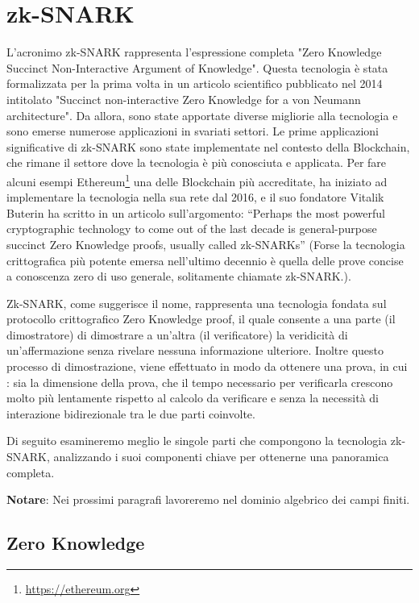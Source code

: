 \section{zk-SNARK}

L'acronimo zk-SNARK rappresenta l'espressione completa "Zero Knowledge Succinct Non-Interactive Argument of Knowledge".
Questa tecnologia è stata formalizzata per la prima volta in un articolo scientifico pubblicato nel 2014 intitolato
"Succinct non-interactive Zero Knowledge for a von Neumann architecture"\cite{10.5555/2671225.2671275}. Da allora, sono state apportate diverse migliorie alla tecnologia
e sono emerse numerose applicazioni in svariati settori. Le prime applicazioni significative di zk-SNARK sono state
implementate nel contesto della Blockchain, che rimane il settore dove la tecnologia è più conosciuta e applicata. Per
fare alcuni esempi Ethereum\footnote{\url{https://ethereum.org}} una delle Blockchain più accreditate,  ha iniziato ad implementare la tecnologia nella sua
rete dal 2016, e il suo fondatore Vitalik Buterin ha scritto in un articolo sull’argomento: “Perhaps the most powerful
cryptographic technology to come out of the last decade is general-purpose succinct Zero Knowledge proofs, usually
called zk-SNARKs” \cite{how-zk-snarks-are-possible} (Forse la tecnologia crittografica più potente emersa nell'ultimo decennio è quella delle prove
concise a conoscenza zero di uso generale, solitamente chiamate zk-SNARK.).

Zk-SNARK, come suggerisce il nome, rappresenta una tecnologia fondata sul protocollo crittografico Zero Knowledge proof,
il quale consente a una parte (il dimostratore) di dimostrare a un'altra (il verificatore) la veridicità di
un'affermazione senza rivelare nessuna informazione ulteriore. Inoltre questo processo di dimostrazione, viene
effettuato in modo da ottenere una prova, in cui : sia la dimensione della prova, che il tempo necessario per verificarla
crescono molto più lentamente rispetto al calcolo da verificare e senza la necessità di interazione bidirezionale tra le
due parti coinvolte.

Di seguito esamineremo meglio le singole parti che compongono la tecnologia zk-SNARK, analizzando i suoi componenti
chiave per ottenerne una panoramica completa.

\textbf{Notare}: Nei prossimi paragrafi lavoreremo nel dominio algebrico dei campi finiti.

\subsection{Zero Knowledge}


